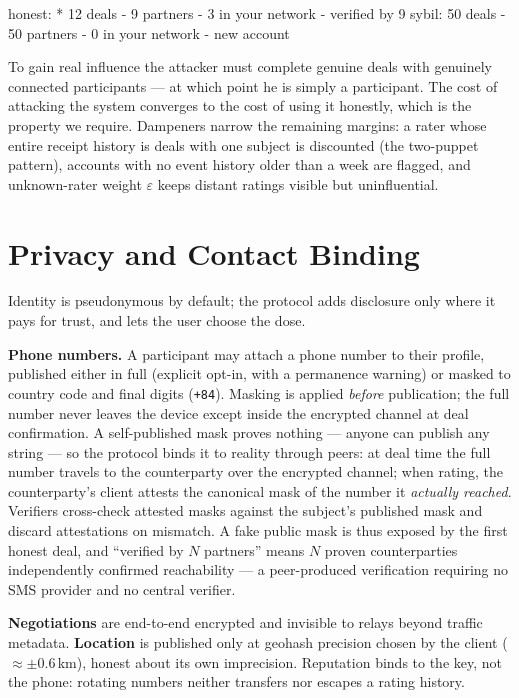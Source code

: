 \documentclass[11pt]{article}
\begin{document}
\begin{code}
honest:  * 12 deals - 9 partners - 3 in your network
           - verified by 9
sybil:   50 deals - 50 partners - 0 in your network
           - new account
\end{code}

To gain real influence the attacker must complete genuine deals with
genuinely connected participants --- at which point he is simply a
participant. The cost of attacking the system converges to the cost of using
it honestly, which is the property we require. Dampeners narrow the
remaining margins: a rater whose entire receipt history is deals with one
subject is discounted (the two-puppet pattern), accounts with no event
history older than a week are flagged, and unknown-rater weight
$\varepsilon$ keeps distant ratings visible but uninfluential.

\section{Privacy and Contact Binding}
\label{sec:privacy}

Identity is pseudonymous by default; the protocol adds disclosure only where
it pays for trust, and lets the user choose the dose.

\textbf{Phone numbers.} A participant may attach a phone number to their
profile, published either in full (explicit opt-in, with a permanence
warning) or masked to country code and final digits
(\texttt{+84\textbullet\textbullet\textbullet\textbullet\textbullet{}}).
Masking is applied \emph{before} publication; the full number never leaves
the device except inside the encrypted channel at deal confirmation. A
self-published mask proves nothing --- anyone can publish any string --- so
the protocol binds it to reality through peers: at deal time the full number
travels to the counterparty over the encrypted channel; when rating, the
counterparty's client attests the canonical mask of the number it
\emph{actually reached}. Verifiers cross-check attested masks against the
subject's published mask and discard attestations on mismatch. A fake public
mask is thus exposed by the first honest deal, and ``verified by $N$
partners'' means $N$ proven counterparties independently confirmed
reachability --- a peer-produced verification requiring no SMS provider and
no central verifier.

\textbf{Negotiations} are end-to-end encrypted and invisible to relays
beyond traffic metadata. \textbf{Location} is published only at geohash
precision chosen by the client ($\approx \pm 0.6$\,km), honest about its own
imprecision. Reputation binds to the key, not the phone: rotating numbers
neither transfers nor escapes a rating history.
\end{document}
